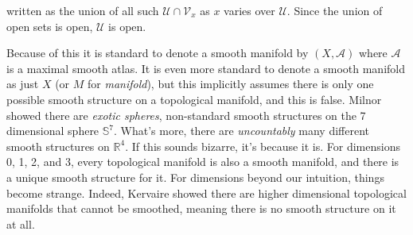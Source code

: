 \documentclass{article}
\theoremstyle{plain}
\theoremstyle{normal}
\begin{document}
        written as the union of all such $\mathcal{U}\cap\mathcal{V}_{x}$ as
        $x$ varies over $\mathcal{U}$. Since the union of open sets is open,
        $\mathcal{U}$ is open.
        \par\hfill\par
        Because of this it is standard to denote a smooth manifold by
        $(X,\mathcal{A})$ where $\mathcal{A}$ is a maximal smooth atlas. It is
        even more standard to denote a smooth manifold as just $X$ (or $M$ for
        \textit{manifold}), but this implicitly assumes there is only one
        possible smooth structure on a topological manifold, and this is false.
        Milnor showed there are \textit{exotic spheres}, non-standard smooth
        structures on the 7 dimensional sphere $\mathbb{S}^{7}$. What's more,
        there are \textit{uncountably} many different smooth structures on
        $\mathbb{R}^{4}$. If this sounds bizarre, it's because it is. For
        dimensions 0, 1, 2, and 3, every topological manifold is also a
        smooth manifold, and there is a unique smooth structure for it.
        For dimensions beyond our intuition, things become strange. Indeed,
        Kervaire showed there are higher dimensional topological manifolds that
        cannot be smoothed, meaning there is no smooth structure on it at all.
\end{document}
